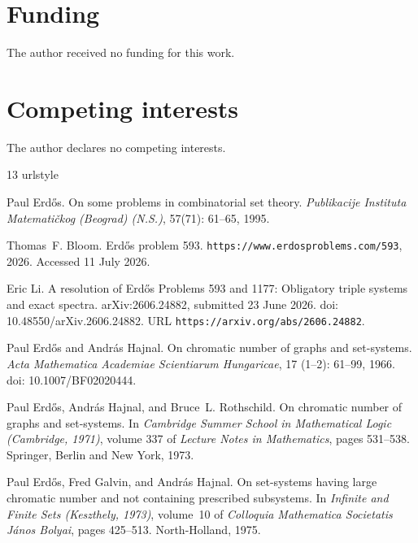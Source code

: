\documentclass[a4paper,11pt,reqno]{amsart}
\theoremstyle{plain}
\theoremstyle{definition}
\theoremstyle{remark}
\begin{document}
\section*{Funding}
The author received no funding for this work.

\section*{Competing interests}
The author declares no competing interests.

\begin{thebibliography}{13}
\providecommand{\natexlab}[1]{#1}
\providecommand{\url}[1]{\texttt{#1}}
\expandafter\ifx\csname urlstyle\endcsname\relax
  \providecommand{\doi}[1]{doi: #1}\else
  \providecommand{\doi}{doi: \begingroup \urlstyle{rm}\Url}\fi

Paul Erd{\H{o}}s.
\newblock On some problems in combinatorial set theory.
\newblock \emph{Publikacije Instituta Matemati\v{c}kog (Beograd) (N.S.)},
  57(71): 61--65, 1995.

Thomas~F. Bloom.
\newblock Erd{\H{o}}s problem 593.
\newblock \url{https://www.erdosproblems.com/593}, 2026.
\newblock Accessed 11 July 2026.

Eric Li.
\newblock A resolution of {Erd{\H{o}}s Problems 593 and 1177}: Obligatory
  triple systems and exact spectra.
\newblock arXiv:2606.24882, submitted 23 June 2026.
\newblock \doi{10.48550/arXiv.2606.24882}.
\newblock URL \url{https://arxiv.org/abs/2606.24882}.

Paul Erd{\H{o}}s and Andr{\'a}s Hajnal.
\newblock On chromatic number of graphs and set-systems.
\newblock \emph{Acta Mathematica Academiae Scientiarum Hungaricae}, 17
  (1--2): 61--99, 1966.
\newblock \doi{10.1007/BF02020444}.

Paul Erd{\H{o}}s, Andr{\'a}s Hajnal, and Bruce~L. Rothschild.
\newblock On chromatic number of graphs and set-systems.
\newblock In \emph{Cambridge Summer School in Mathematical Logic (Cambridge,
  1971)}, volume 337 of \emph{Lecture Notes in Mathematics}, pages 531--538.
  Springer, Berlin and New York, 1973.

Paul Erd{\H{o}}s, Fred Galvin, and Andr{\'a}s Hajnal.
\newblock On set-systems having large chromatic number and not containing
  prescribed subsystems.
\newblock In \emph{Infinite and Finite Sets (Keszthely, 1973)}, volume~10 of
  \emph{Colloquia Mathematica Societatis J{\'a}nos Bolyai}, pages 425--513.
  North-Holland, 1975.


\end{thebibliography}
\end{document}
